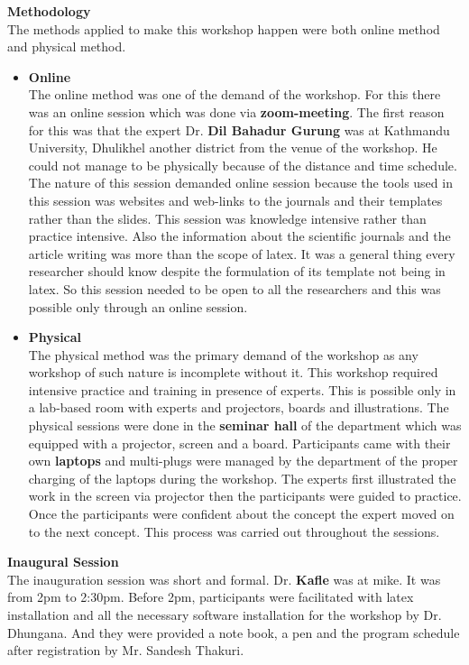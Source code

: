 \documentclass[a4paper,12pt]{report}
\begin{document}
\vspace*{1cm}
{\Large \textbf{Methodology}}\\[5mm]
The methods applied to make this workshop happen were both online method and physical method.
\vspace{2mm}
\begin{itemize}
\item \textbf{Online}\\[2mm]
  The online method was one of the demand of the workshop. For this there was an online session which was done via \textbf{zoom-meeting}. The first reason for this was that the expert Dr. \textbf{Dil Bahadur Gurung} was at Kathmandu University, Dhulikhel another district from the venue of the workshop. He could not manage to be physically because of the distance and time schedule. The nature of this session demanded online session because the tools used in this session was websites and web-links to the journals and their templates rather than the slides. This session was knowledge intensive rather than practice intensive. Also the information about the scientific journals and the article writing was more than the scope of latex. It was a general thing every researcher should know despite the formulation of its template not being in latex. So this session needed to be open to all the researchers and this was possible only through an online session. \vspace{2cm}

\item \textbf{Physical}\\[2mm]
  The physical method was the primary demand of the workshop as any workshop of such nature is incomplete without it. This workshop required intensive practice and training in presence of experts. This is possible only in a lab-based room with experts and projectors, boards and illustrations. The physical sessions were done in the \textbf{seminar hall} of the department which was equipped with a projector, screen and a board. Participants came with their own \textbf{laptops} and multi-plugs were managed by the department of the proper charging of the laptops during the workshop. The experts first illustrated the work in the screen via projector then the participants were guided to practice. Once the participants were confident about the concept the expert moved on to the next concept. This process was carried out throughout the sessions.
\end{itemize}
\clearpage

{\bfseries \Large Inaugural Session}\\[3mm]
The inauguration session was short and formal. Dr. \textbf{Kafle} was at mike. It was from 2pm to 2:30pm. Before 2pm, participants were facilitated with latex installation and all the necessary software installation for the workshop by Dr. Dhungana. And they were provided a note book, a pen and the program schedule after registration by Mr. Sandesh Thakuri.\\[2mm]
\end{document}
